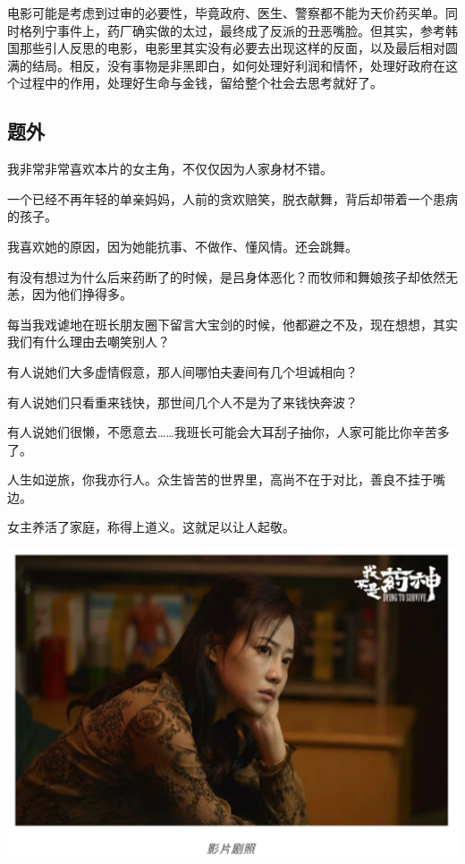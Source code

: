 \documentclass[
]{book}
\begin{document}
电影可能是考虑到过审的必要性，毕竟政府、医生、警察都不能为天价药买单。同时格列宁事件上，药厂确实做的太过，最终成了反派的丑恶嘴脸。但其实，参考韩国那些引人反思的电影，电影里其实没有必要去出现这样的反面，以及最后相对圆满的结局。相反，没有事物是非黑即白，如何处理好利润和情怀，处理好政府在这个过程中的作用，处理好生命与金钱，留给整个社会去思考就好了。

\hypertarget{ux9898ux5916}{%
\subsection{题外}\label{ux9898ux5916}}

我非常非常喜欢本片的女主角，不仅仅因为人家身材不错。

一个已经不再年轻的单亲妈妈，人前的贪欢赔笑，脱衣献舞，背后却带着一个患病的孩子。

我喜欢她的原因，因为她能抗事、不做作、懂风情。还会跳舞。

有没有想过为什么后来药断了的时候，是吕身体恶化？而牧师和舞娘孩子却依然无恙，因为他们挣得多。

每当我戏谑地在班长朋友圈下留言大宝剑的时候，他都避之不及，现在想想，其实我们有什么理由去嘲笑别人？

有人说她们大多虚情假意，那人间哪怕夫妻间有几个坦诚相向？

有人说她们只看重来钱快，那世间几个人不是为了来钱快奔波？

有人说她们很懒，不愿意去\ldots\ldots 我班长可能会大耳刮子抽你，人家可能比你辛苦多了。

人生如逆旅，你我亦行人。众生皆苦的世界里，高尚不在于对比，善良不挂于嘴边。

女主养活了家庭，称得上道义。这就足以让人起敬。

\includegraphics[width=6.67in]{images/yaoshen3}
\end{document}

